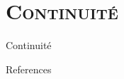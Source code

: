 \documentclass[xcolor=x11names,compress]{beamer}
\renewcommand{\(}{\begin{columns}} \renewcommand{\)}{\end{columns}}
\newcommand{\<}[1]{\begin{column}{#1}} \renewcommand{\>}{\end{column}}
\begin{document}
\section{\scshape Continuité}
\begin{frame}{Continuité}

\end{frame}

\begin{frame}{References}





\end{frame}
\end{document}
